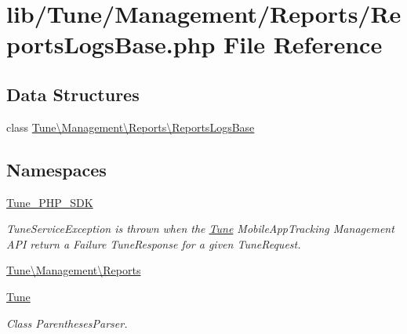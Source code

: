\hypertarget{ReportsLogsBase_8php}{\section{lib/\-Tune/\-Management/\-Reports/\-Reports\-Logs\-Base.php File Reference}
\label{ReportsLogsBase_8php}
}
\subsection*{Data Structures}
\begin{DoxyCompactItemize}
\item 
class \hyperlink{classTune_1_1Management_1_1Reports_1_1ReportsLogsBase}{Tune\textbackslash{}\-Management\textbackslash{}\-Reports\textbackslash{}\-Reports\-Logs\-Base}
\end{DoxyCompactItemize}
\subsection*{Namespaces}
\begin{DoxyCompactItemize}
\item 
\hyperlink{namespaceTune__PHP__SDK}{Tune\-\_\-\-P\-H\-P\-\_\-\-S\-D\-K}
\begin{DoxyCompactList}\small\item\em Tune\-Service\-Exception is thrown when the \hyperlink{namespaceTune}{Tune} Mobile\-App\-Tracking Management A\-P\-I return a Failure Tune\-Response for a given Tune\-Request. \end{DoxyCompactList}\item 
\hyperlink{namespaceTune_1_1Management_1_1Reports}{Tune\textbackslash{}\-Management\textbackslash{}\-Reports}
\item 
\hyperlink{namespaceTune}{Tune}
\begin{DoxyCompactList}\small\item\em Class Parentheses\-Parser. \end{DoxyCompactList}\end{DoxyCompactItemize}
